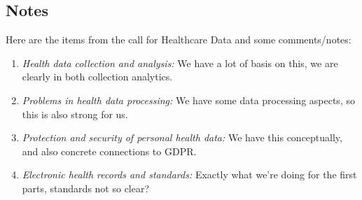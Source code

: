 










\subsection*{Notes}

Here are the items from the call for Healthcare Data and some comments/notes:
\begin{enumerate}
\item 
\emph{Health data collection and analysis:}
We have a lot of basis on this, we are clearly in both collection analytics.

\item 
\emph{Problems in health data processing:}
We have some data processing aspects, so this is also strong for us.

\item 
\emph{Protection and security of personal health data:}
We have this conceptually, and also concrete connections to GDPR.

\item 
\emph{Electronic health records and standards:}
Exactly what we're doing for the first parts, standards not so clear?
\end{enumerate}



